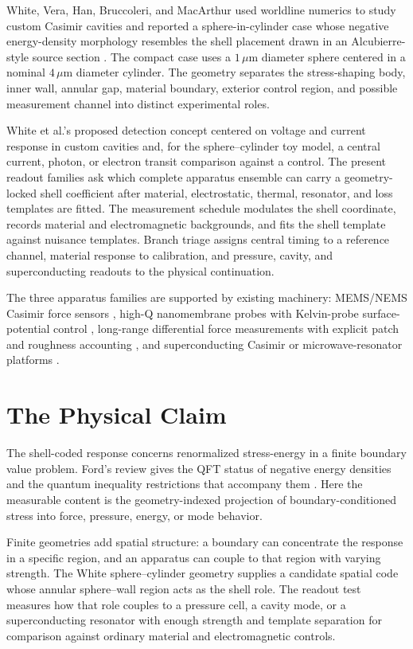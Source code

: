 \documentclass[11pt]{article}
\newcommand{\um}{\,\mu\mathrm{m}}
\begin{document}
White, Vera, Han, Bruccoleri, and MacArthur used worldline numerics to study
custom Casimir cavities and reported a sphere-in-cylinder case whose negative
energy-density morphology resembles the shell placement drawn in an
Alcubierre-style source section \cite{White2021,Alcubierre1994}. The compact
case uses a \(1\um\) diameter sphere centered in a nominal \(4\um\) diameter
cylinder. The geometry separates the stress-shaping body, inner wall, annular
gap, material boundary, exterior control region, and possible measurement
channel into distinct experimental roles.

White et al.'s proposed detection concept centered on voltage and current response
in custom cavities and, for the sphere--cylinder toy model, a central
current, photon, or electron transit comparison against a control. The present
readout families ask which complete apparatus ensemble can carry a
geometry-locked shell coefficient after material, electrostatic, thermal,
resonator, and loss templates are fitted. The measurement schedule modulates
the shell coordinate, records material and electromagnetic backgrounds, and
fits the shell template against nuisance templates. Branch triage assigns
central timing to a reference channel, material response to calibration, and
pressure, cavity, and superconducting readouts to the physical continuation.

The three apparatus families are supported by existing machinery: MEMS/NEMS
Casimir force sensors \cite{Decca2011,Stange2019}, high-Q nanomembrane probes
with Kelvin-probe surface-potential control
\cite{GarciaSanchez2012,GarciaSanchez2013}, long-range differential force
measurements with explicit patch and roughness accounting \cite{Bimonte2021},
and superconducting Casimir or microwave-resonator platforms
\cite{Perez2020,Gurevich2023,DeJong2025,Xu2026}.

\section{The Physical Claim}

The shell-coded response concerns renormalized stress-energy in a finite
boundary value problem. Ford's review gives the QFT status of negative energy
densities and the quantum inequality restrictions that accompany them
\cite{Ford2009}. Here the measurable content is the geometry-indexed
projection of boundary-conditioned stress into force, pressure, energy, or
mode behavior.

Finite geometries add spatial structure: a boundary can concentrate the
response in a specific region, and an apparatus can couple to that region with
varying strength. The White sphere--cylinder geometry supplies a candidate
spatial code whose annular sphere--wall region acts as the shell role. The
readout test measures how that role couples to a pressure cell, a cavity mode,
or a superconducting resonator with enough strength and template separation
for comparison against ordinary material and electromagnetic controls.
\end{document}
